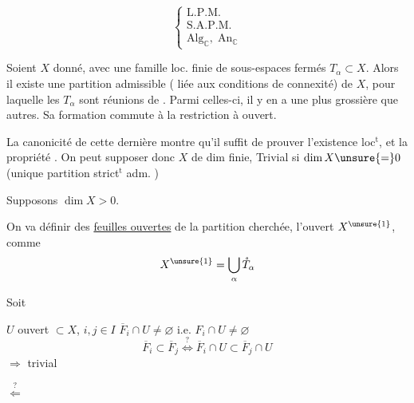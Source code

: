 \[
\left\{\begin{array}{l}
\mathrm{L.P.M.}\\
\mathrm{S.A.P.M.}\\
\mathrm{Alg}_{\mathbb C},\;\mathrm{An}_{\mathbb C}
\end{array}\right.
\]

Soient $X$ donné, avec une famille loc. finie de sous-espaces fermés $T_\alpha\subset X$. Alors il existe une partition  admissible ( liée aux conditions de connexité) de $X$, pour laquelle les $T_\alpha$ sont réunions de . Parmi celles-ci, il y en a une plus grossière que  autres. Sa formation commute à la restriction à  ouvert.

La canonicité de cette dernière montre qu'il suffit de prouver l'existence loc$^{\mathrm t}$, et la propriété . On peut supposer donc $X$ de dim finie,   Trivial si $\dim X\unsure{=}0$ (unique partition strict$^{\mathrm t}$ adm. )


Supposons $\dim X>0$.

On va définir  des \uline{feuilles ouvertes} de la partition cherchée,   l'ouvert $X^{\unsure{1}}$, comme
\[
X^{\unsure{1}}=\bigcup_\alpha \mathring{T}_\alpha
\]

Soit


$U$ ouvert $\subset X$, $i,j\in I$ \quad $\overline F_i\cap U\neq\varnothing$ i.e. $F_i\cap U\neq\varnothing$
\[
\overline F_i\subset\overline F_j
\overset{?}{\Longleftrightarrow}
\overline F_i\cap U\subset\overline F_j\cap U
\]
$\Rightarrow$ trivial

$\overset{?}{\Leftarrow}$


